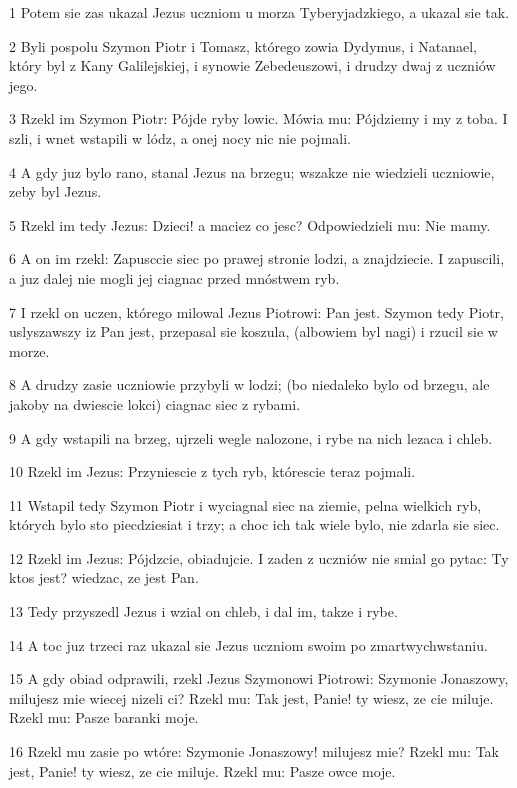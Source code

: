 \par 1 Potem sie zas ukazal Jezus uczniom u morza Tyberyjadzkiego, a ukazal sie tak.
\par 2 Byli pospolu Szymon Piotr i Tomasz, którego zowia Dydymus, i Natanael, który byl z Kany Galilejskiej, i synowie Zebedeuszowi, i drudzy dwaj z uczniów jego.
\par 3 Rzekl im Szymon Piotr: Pójde ryby lowic. Mówia mu: Pójdziemy i my z toba. I szli, i wnet wstapili w lódz, a onej nocy nic nie pojmali.
\par 4 A gdy juz bylo rano, stanal Jezus na brzegu; wszakze nie wiedzieli uczniowie, zeby byl Jezus.
\par 5 Rzekl im tedy Jezus: Dzieci! a maciez co jesc? Odpowiedzieli mu: Nie mamy.
\par 6 A on im rzekl: Zapusccie siec po prawej stronie lodzi, a znajdziecie. I zapuscili, a juz dalej nie mogli jej ciagnac przed mnóstwem ryb.
\par 7 I rzekl on uczen, którego milowal Jezus Piotrowi: Pan jest. Szymon tedy Piotr, uslyszawszy iz Pan jest, przepasal sie koszula, (albowiem byl nagi) i rzucil sie w morze.
\par 8 A drudzy zasie uczniowie przybyli w lodzi; (bo niedaleko bylo od brzegu, ale jakoby na dwiescie lokci) ciagnac siec z rybami.
\par 9 A gdy wstapili na brzeg, ujrzeli wegle nalozone, i rybe na nich lezaca i chleb.
\par 10 Rzekl im Jezus: Przyniescie z tych ryb, którescie teraz pojmali.
\par 11 Wstapil tedy Szymon Piotr i wyciagnal siec na ziemie, pelna wielkich ryb, których bylo sto piecdziesiat i trzy; a choc ich tak wiele bylo, nie zdarla sie siec.
\par 12 Rzekl im Jezus: Pójdzcie, obiadujcie. I zaden z uczniów nie smial go pytac: Ty ktos jest? wiedzac, ze jest Pan.
\par 13 Tedy przyszedl Jezus i wzial on chleb, i dal im, takze i rybe.
\par 14 A toc juz trzeci raz ukazal sie Jezus uczniom swoim po zmartwychwstaniu.
\par 15 A gdy obiad odprawili, rzekl Jezus Szymonowi Piotrowi: Szymonie Jonaszowy, milujesz mie wiecej nizeli ci? Rzekl mu: Tak jest, Panie! ty wiesz, ze cie miluje. Rzekl mu: Pasze baranki moje.
\par 16 Rzekl mu zasie po wtóre: Szymonie Jonaszowy! milujesz mie? Rzekl mu: Tak jest, Panie! ty wiesz, ze cie miluje. Rzekl mu: Pasze owce moje.
